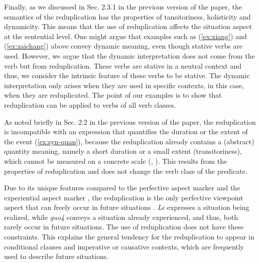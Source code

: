 \documentclass[fleqn,twoside]{article}
\begin{document}
\begin{enumerate}
Finally, as we discussed in Sec. 2.3.1 in the previous version of the paper, the semantics of the reduplication has the properties of tansitoriness, holisticity and dynamicity.
This means that the use of reduplication affects the situation aspect at the sentential level.
One might argue that examples such as (\ref{ex:xiang}) and (\ref{ex:zaichang}) above convey dynamic meaning, even though stative verbs are used.
However, we argue that the dynamic interpretation does not come from the verb but from reduplication.
These verbs are stative in a neutral context and thus, we consider the intrinsic feature of these verbs to be stative.
The dynamic interpretation only arises when they are used in specific contexts, in this case, when they are reduplicated.
The point of our examples is to show that reduplication can be applied to verbs of all verb classes.

As noted briefly in Sec. 2.2 in the previous version of the paper,
the reduplication is incompatible with an expression that quantifies the duration or the extent of the event (\ref{ex:syn-quan}),
 because the reduplication already contains a (abstract) quantity meaning, namely a short duration or a small extent (transitoriness),
 which cannot be measured on a concrete scale (\citealt[155]{XiaoMcEnery2004}, \citealt[333]{SuiHu2016}).
 \ea %
 \label{ex:syn-quan}
 \z
 \z
 This results from the properties of reduplication and does not change the verb class of the predicate.

Due to its unique features compared to the perfective aspect marker  and the experiential aspect marker ,
the reduplication is the only perfective viewpoint aspect that can freely occur in future situations \citep[156--157]{XiaoMcEnery2004}.
\textit{Le} expresses a situation being realized,
while \textit{guo4} conveys a situation already experienced,
and thus, both rarely occur in future situations.
The use of reduplication does not have these constraints.
This explains the general tendency for the reduplication to appear in conditional clauses and imperative or causative contexts,
which are frequently used to describe future situations.


\end{enumerate}
\end{document}
